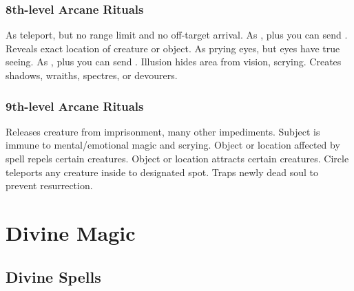 \subsubsection{8th-level Arcane Rituals}
\begin{rituallist}
     As teleport, but no range limit and no off-target arrival.
     As , plus you can send .
     Reveals exact location of creature or object.
     As prying eyes, but eyes have true seeing.
     As , plus you can send .
     Illusion hides area from vision, scrying.
    \M Creates shadows, wraiths, spectres, or devourers.
\end{rituallist}

\subsubsection{9th-level Arcane Rituals}
\begin{rituallist}
     Releases creature from imprisonment, many other impediments.
     Subject is immune to mental/emotional magic and scrying.
     Object or location affected by spell repels certain creatures.
    \F Object or location attracts certain creatures.
     Circle teleports any creature inside to designated spot.
    \F Traps newly dead soul to prevent resurrection.
\end{rituallist}

\section{Divine Magic}\label{Divine Magic}

\subsection{Divine Spells}\label{Divine Spells}

